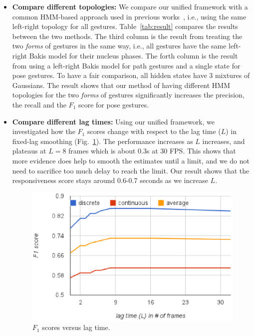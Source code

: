 \documentclass[conference]{IEEEtran}
\begin{document}
\begin{itemize}
  \item \textbf{Compare different topologies: }
We compare our unified framework with a common HMM-based approach
used in previous works~\cite{sharma00, Starner95}, i.e., using the same
left-right topology for all gestures. Table~\ref{tab:result} compares the results between the two methods.
The third column is the result from treating the two \textit{forms} of gestures
in the same way, i.e., all gestures have the same left-right Bakis model for their nucleus
phases. The forth column is the result from using a left-right Bakis model for
path gestures and a single state for pose gestures. To have a fair comparison,
all hidden states have 3 mixtures of Gaussians. The result 
shows that our method of having different HMM topologies for the two
\textit{forms} of gestures significantly increases the precision, the recall and
the $F_1$ score for pose gestures.

\item \textbf{Compare different lag times: }
Using our unified framework, we investigated how the $F_1$ scores change with
respect to the lag time ($L$) in fixed-lag smoothing (Fig.~\ref{fig:lag}). The
performance increases as $L$ increases, and plateaus at $L=8$ frames which is about 0.3s at 30 FPS. This shows that more evidence does help to smooth the estimates until a limit, and we do not need to sacrifice too much delay to reach the limit. Our result shows that the
responsiveness score stays around 0.6-0.7 seconds as we increase $L$.

\begin{figure}[t]
\centering
\includegraphics[trim=0 5mm 0 15mm, clip, width=\columnwidth]{fig/f1_lag.ps}
\caption{$F_1$ scores versus lag time.}
\label{fig:lag}
\end{figure}


\end{itemize}
\end{document}
